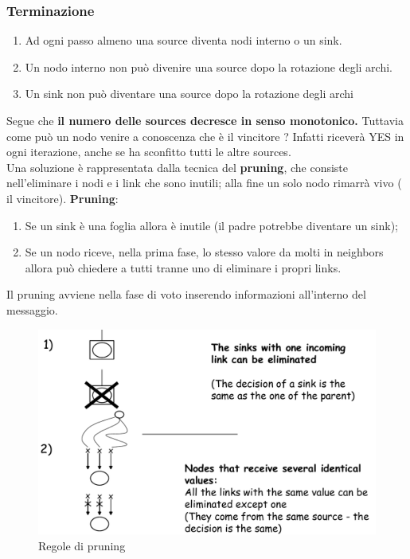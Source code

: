 \documentclass[12pt]{article}
\begin{document}
		\subsubsection{Terminazione}
			\begin{enumerate}
				\item Ad ogni passo almeno una source diventa nodi interno o un sink.
				\item Un nodo interno non può divenire una source dopo la rotazione degli archi.
				\item Un sink non può diventare una source dopo la rotazione degli archi
			\end{enumerate}
			Segue che \textbf{ il numero delle sources decresce in senso monotonico.}
			Tuttavia come può un nodo venire a conoscenza che è il vincitore ? Infatti riceverà YES in ogni iterazione, anche se ha sconfitto tutti le altre sources.\\
			Una soluzione è rappresentata dalla tecnica del \textbf{pruning}, che consiste nell'eliminare i nodi e i link che sono inutili; alla fine un solo nodo rimarrà vivo ( il vincitore).
			\textbf{Pruning}:
			\begin{enumerate}
				\item Se un sink è una foglia allora è inutile (il padre potrebbe diventare un sink);
				\item Se un nodo riceve, nella prima fase, lo stesso valore da molti in neighbors allora può chiedere a tutti tranne uno di eliminare i propri links.
			\end{enumerate}
			Il pruning avviene nella fase di voto inserendo informazioni all'interno del messaggio.
			\begin{figure}[h!]
				\centering
				\includegraphics[scale=0.30]{img/prune.png}
				\caption{Regole di pruning}
			\end{figure}
\end{document}
